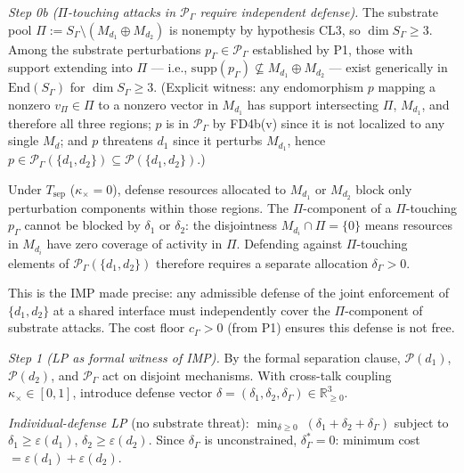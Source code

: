 \documentclass[11pt]{article}
\theoremstyle{remark}
\begin{document}
\textit{Step 0b ($\Pi$-touching attacks in $\mathcal{P}_\Gamma$ require independent defense).}
The substrate pool $\Pi := S_\Gamma \setminus (M_{d_1} \oplus M_{d_2})$ is nonempty by hypothesis CL3, so $\dim S_\Gamma \ge 3$.  Among the substrate perturbations $p_\Gamma \in \mathcal{P}_\Gamma$ established by P1, those with support extending into $\Pi$ --- i.e., $\mathrm{supp}(p_\Gamma) \not\subseteq M_{d_1} \oplus M_{d_2}$ --- exist generically in $\mathrm{End}(S_\Gamma)$ for $\dim S_\Gamma \ge 3$.  (Explicit witness: any endomorphism $p$ mapping a nonzero $v_\Pi \in \Pi$ to a nonzero vector in $M_{d_1}$ has support intersecting $\Pi$, $M_{d_1}$, and therefore all three regions; $p$ is in $\mathcal{P}_\Gamma$ by FD4b(v) since it is not localized to any single $M_d$; and $p$ threatens $d_1$ since it perturbs $M_{d_1}$, hence $p \in \mathcal{P}_\Gamma(\{d_1,d_2\}) \subseteq \mathcal{P}(\{d_1,d_2\})$.)

Under $T_{\mathrm{sep}}$ ($\kappa_\times = 0$), defense resources allocated to $M_{d_1}$ or $M_{d_2}$ block only perturbation components within those regions.  The $\Pi$-component of a $\Pi$-touching $p_\Gamma$ cannot be blocked by $\delta_1$ or $\delta_2$: the disjointness $M_{d_i} \cap \Pi = \{0\}$ means resources in $M_{d_i}$ have zero coverage of activity in $\Pi$.  Defending against $\Pi$-touching elements of $\mathcal{P}_\Gamma(\{d_1,d_2\})$ therefore requires a separate allocation $\delta_\Gamma > 0$.

This is the IMP made precise: any admissible defense of the joint enforcement of $\{d_1, d_2\}$ at a shared interface must independently cover the $\Pi$-component of substrate attacks.  The cost floor $c_\Gamma > 0$ (from P1) ensures this defense is not free.

\textit{Step 1 (LP as formal witness of IMP).}
By the formal separation clause, $\mathcal{P}(d_1)$, $\mathcal{P}(d_2)$, and $\mathcal{P}_\Gamma$ act on disjoint mechanisms.  With cross-talk coupling $\kappa_\times \in [0,1]$, introduce defense vector $\delta = (\delta_1, \delta_2, \delta_\Gamma) \in \mathbb{R}^3_{\ge 0}$.

\textit{Individual-defense LP} (no substrate threat):
$\min_{\delta \ge 0}\;(\delta_1 + \delta_2 + \delta_\Gamma)$ subject to $\delta_1 \ge \varepsilon(d_1)$, $\delta_2 \ge \varepsilon(d_2)$.
Since $\delta_\Gamma$ is unconstrained, $\delta_\Gamma^* = 0$: minimum cost $= \varepsilon(d_1) + \varepsilon(d_2)$.
\end{document}
